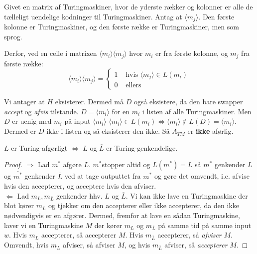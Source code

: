 Givet en matrix af Turingmaskiner, hvor de yderste rækker og kolonner er alle de tælleligt uendelige kodninger til Turingmaskiner. Antag at $\langle m_{j} \rangle$. Den første kolonne er Turingmaskiner, og den første række er Turingmaskiner, men som sprog.

Derfor, ved en celle i matrixen \(\langle m_{i} \rangle \langle m_{j} \rangle\)  hvor $m_{i}$ er fra første kolonne, og $m_{j}$ fra første række:
\begin{equation*}
	\langle m_{i} \rangle \langle m_{j} \rangle = \begin{cases}
		1 & \text{ hvis } \langle m_{j} \rangle \in L(m_{i}) \\
		0 & \text{ ellers}
	\end{cases}
\end{equation*}

Vi antager at $H$ eksisterer. Dermed må $D$ også eksistere, da den bare swapper \textit{accept} og \textit{afvis} tilstande. $D = \langle m_{i} \rangle $ for en $m_{i}$ i listen af alle Turingmaskiner. Men $D$ er uenig med $m_{i}$ på input $\langle m_{i} \rangle $ $\langle m_{i} \rangle \in L(m_{i}) \iff \langle m_{i} \rangle \notin  L(D) = \langle m_{i} \rangle $. Dermed er $D$ ikke i listen og så eksisterer den ikke. Så $A_{TM}$ er \textbf{ikke} aførlig.


\begin{theorem}
	\label{teo:lnotlrec}
	$L$ er Turing-afgørligt $\iff$ $L$ og $\overline{L}$ er Turing-genkendelige.
\end{theorem}

\begin{proof}
	\(\Rightarrow\) Lad $m^{*}$ afgøre $L$. $m^{*}$stopper altid og $L(m^{*}) = L$ så $m^{*}$ genkender $L$ og $\overline{m^{*}}$ genkender $\overline{L}$ ved at tage outputtet fra $m^{*}$ og gøre det omvendt, i.e. afvise hvis den accepterer, og acceptere hvis den afviser.\\
	\(\Leftarrow\) Lad $m_{L}, m_{\overline{L}}$ genkender hhv. $L$ og $\overline{L}$. Vi kan ikke lave en Turingmaskine der blot kører $m_{L}$ og tjekker om den accepterer eller ikke accepterer, da den ikke nødvendigvis er en afgører. Dermed, fremfor at lave en sådan Turingmaskine, laver vi en Turingmaskine $M$ der kører $m_{L}$ og $m_{\overline{L}}$ på samme tid på samme input $w$. Hvis $m_{L}$ accepterer, så accepterer $M$. Hvis $m_{\overline{L}}$ accepterer, så \textit{afviser} $M$. Omvendt, hvis $m_{L}$ afviser, så afviser $M$, og hvis $m_{\overline{L}}$ afviser, så \textit{accepterer} $M$.
\end{proof}


